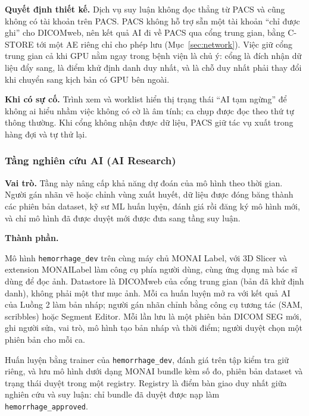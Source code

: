 \textbf{Quyết định thiết kế.} Dịch vụ suy luận không đọc thẳng từ PACS và cũng không
có tài khoản trên PACS. PACS không hỗ trợ sẵn một tài khoản ``chỉ được ghi'' cho
DICOMweb, nên kết quả AI đi về PACS qua cổng trung gian, bằng C-STORE tới một AE riêng
chỉ cho phép lưu (Mục~\ref{sec:network}). Việc giữ cổng trung gian cả khi GPU nằm
ngay trong bệnh viện là chủ ý: cổng là đích nhận dữ liệu đẩy sang, là điểm khử định
danh duy nhất, và là chỗ duy nhất phải thay đổi khi chuyển sang kịch bản có GPU bên
ngoài.

\textbf{Khi có sự cố.} Trình xem và worklist hiển thị trạng thái ``AI tạm ngừng'' để
không ai hiểu nhầm việc không có cờ là âm tính; ca chụp được đọc theo thứ tự thông
thường. Khi cổng không nhận được dữ liệu, PACS giữ tác vụ xuất trong hàng đợi và tự
thử lại.

\subsubsection{Tầng nghiên cứu AI (AI Research)}

\textbf{Vai trò.} Tầng này nâng cấp khả năng dự đoán của mô hình theo thời gian. Người
gán nhãn vẽ hoặc chỉnh vùng xuất huyết, dữ liệu được đóng băng thành các phiên bản
dataset, kỹ sư ML huấn luyện, đánh giá rồi đăng ký mô hình mới, và chỉ mô hình đã được
duyệt mới được đưa sang tầng suy luận.

\textbf{Thành phần.}
\begin{description}[leftmargin=3.4cm,style=nextline]
\item[Gán nhãn] Mô hình \texttt{hemorrhage\_dev} trên cùng máy chủ MONAI Label, với 3D
      Slicer và extension MONAILabel làm công cụ phía người dùng, cùng ứng dụng mà bác sĩ
      dùng để đọc ảnh. Datastore là DICOMweb của cổng trung gian (bản đã khử định danh),
      không phải một thư mục ảnh. Mỗi ca huấn luyện mở ra với kết quả AI của Luồng 2 làm
      bản nháp; người gán nhãn chỉnh bằng công cụ tương tác (SAM, scribbles) hoặc Segment
      Editor. Mỗi lần lưu là một phiên bản DICOM SEG mới, ghi người sửa, vai trò, mô hình
      tạo bản nháp và thời điểm; người duyệt chọn một phiên bản cho mỗi ca.
\item[Huấn luyện và registry] Huấn luyện bằng trainer của \texttt{hemorrhage\_dev}, đánh giá trên tập kiểm tra giữ riêng, và lưu mô hình dưới dạng MONAI
      bundle kèm số đo, phiên bản dataset và trạng thái duyệt trong một registry. Registry
      là điểm bàn giao duy nhất giữa nghiên cứu và suy luận: chỉ bundle đã duyệt được
      nạp làm \texttt{hemorrhage\_approved}.
\end{description}

